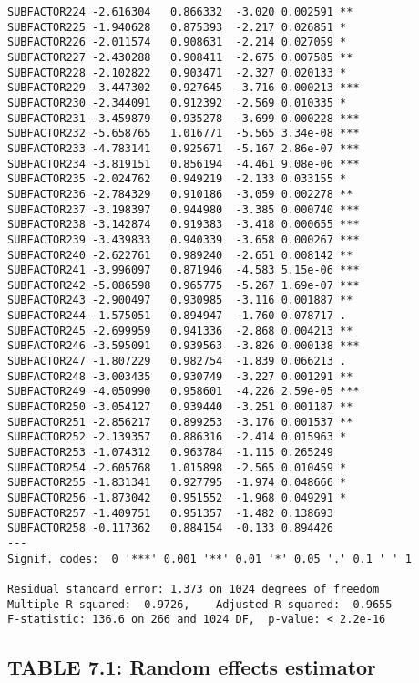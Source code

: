 \documentclass[]{book}
\begin{document}
\begin{verbatim}
SUBFACTOR224 -2.616304   0.866332  -3.020 0.002591 ** 
SUBFACTOR225 -1.940628   0.875393  -2.217 0.026851 *  
SUBFACTOR226 -2.011574   0.908631  -2.214 0.027059 *  
SUBFACTOR227 -2.430288   0.908411  -2.675 0.007585 ** 
SUBFACTOR228 -2.102822   0.903471  -2.327 0.020133 *  
SUBFACTOR229 -3.447302   0.927645  -3.716 0.000213 ***
SUBFACTOR230 -2.344091   0.912392  -2.569 0.010335 *  
SUBFACTOR231 -3.459879   0.935278  -3.699 0.000228 ***
SUBFACTOR232 -5.658765   1.016771  -5.565 3.34e-08 ***
SUBFACTOR233 -4.783141   0.925671  -5.167 2.86e-07 ***
SUBFACTOR234 -3.819151   0.856194  -4.461 9.08e-06 ***
SUBFACTOR235 -2.024762   0.949219  -2.133 0.033155 *  
SUBFACTOR236 -2.784329   0.910186  -3.059 0.002278 ** 
SUBFACTOR237 -3.198397   0.944980  -3.385 0.000740 ***
SUBFACTOR238 -3.142874   0.919383  -3.418 0.000655 ***
SUBFACTOR239 -3.439833   0.940339  -3.658 0.000267 ***
SUBFACTOR240 -2.622761   0.989240  -2.651 0.008142 ** 
SUBFACTOR241 -3.996097   0.871946  -4.583 5.15e-06 ***
SUBFACTOR242 -5.086598   0.965775  -5.267 1.69e-07 ***
SUBFACTOR243 -2.900497   0.930985  -3.116 0.001887 ** 
SUBFACTOR244 -1.575051   0.894947  -1.760 0.078717 .  
SUBFACTOR245 -2.699959   0.941336  -2.868 0.004213 ** 
SUBFACTOR246 -3.595091   0.939563  -3.826 0.000138 ***
SUBFACTOR247 -1.807229   0.982754  -1.839 0.066213 .  
SUBFACTOR248 -3.003435   0.930749  -3.227 0.001291 ** 
SUBFACTOR249 -4.050990   0.958601  -4.226 2.59e-05 ***
SUBFACTOR250 -3.054127   0.939440  -3.251 0.001187 ** 
SUBFACTOR251 -2.856217   0.899253  -3.176 0.001537 ** 
SUBFACTOR252 -2.139357   0.886316  -2.414 0.015963 *  
SUBFACTOR253 -1.074312   0.963784  -1.115 0.265249    
SUBFACTOR254 -2.605768   1.015898  -2.565 0.010459 *  
SUBFACTOR255 -1.831341   0.927795  -1.974 0.048666 *  
SUBFACTOR256 -1.873042   0.951552  -1.968 0.049291 *  
SUBFACTOR257 -1.409751   0.951357  -1.482 0.138693    
SUBFACTOR258 -0.117362   0.884154  -0.133 0.894426    
---
Signif. codes:  0 '***' 0.001 '**' 0.01 '*' 0.05 '.' 0.1 ' ' 1

Residual standard error: 1.373 on 1024 degrees of freedom
Multiple R-squared:  0.9726,    Adjusted R-squared:  0.9655 
F-statistic: 136.6 on 266 and 1024 DF,  p-value: < 2.2e-16
\end{verbatim}

\hypertarget{table-7.1-random-effects-estimator}{%
\subsection{TABLE 7.1: Random effects estimator}\label{table-7.1-random-effects-estimator}}
\end{document}
